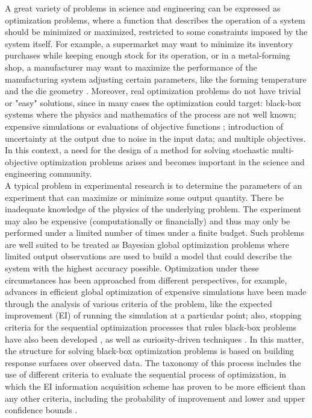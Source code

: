 \documentclass{article}
\begin{document}
A great variety of problems in science and engineering can be expressed as optimization problems, where a function that describes the operation of a system should be minimized or maximized, restricted to some constraints imposed by the system itself. For example, a supermarket may want to minimize its inventory purchases while keeping enough stock for its operation, or in a metal-forming shop, a manufacturer may want to maximize the performance of the manufacturing system adjusting certain parameters, like the forming temperature and the die geometry \cite{Huang2006}. Moreover, real optimization problems do not have trivial or "easy" solutions, since in many cases the optimization could target: black-box systems where the physics and mathematics of the process are not well known; expensive simulations or evaluations of objective functions \cite{Jones1998}; introduction of uncertainty at the output due to noise in the input data; and multiple objectives. In this context, a need for the design of a method for solving stochastic multi-objective optimization problems arises and becomes important in the science and engineering community.\\

A typical problem in experimental research is to determine the parameters of an experiment that can maximize or minimize some output quantity. There be inadequate knowledge of the physics of the underlying problem. The experiment may also be expensive (computationally or financially) and thus may only be performed under a limited number of times under a finite budget. Such problems are well suited to be treated as Bayesian global optimization problems where limited output observations are used to build a model that could describe the system with the highest accuracy possible. Optimization under these circumstances has been approached from different perspectives, for example, advances in efficient global optimization of expensive simulations have been made through the analysis of various criteria of the problem, like the expected improvement (EI) of running the simulation at a particular point; also, stopping criteria for the sequential optimization processes that rules black-box problems have also been developed \cite{Jones1998}, as well as curiosity-driven techniques \cite{Schaul2011}. In this matter, the structure for solving black-box optimization problems is based on building response surfaces over observed data. The taxonomy of this process includes the use of different criteria to evaluate the sequential process of optimization, in which the EI information acquisition scheme has proven to be more efficient than any other criteria, including the probability of improvement and lower and upper confidence bounds \cite{Jones2001}.\\
\end{document}

